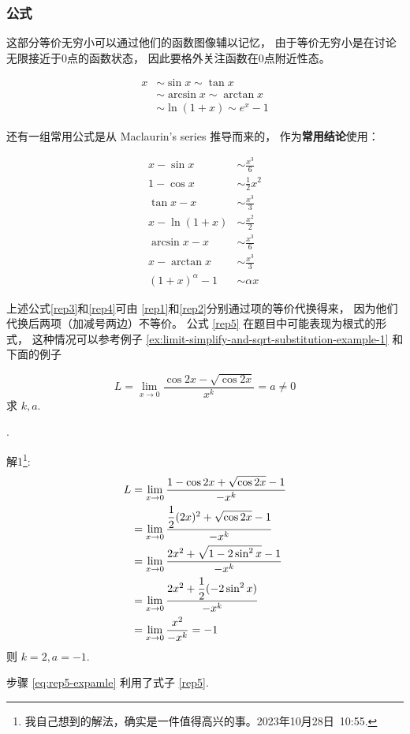 \subsubsection{公式}
这部分等价无穷小可以通过他们的函数图像辅以记忆，
由于等价无穷小是在讨论无限接近于0点的函数状态，
因此要格外关注函数在0点附近性态。

\begin{lemma}[等价无穷小]
	\begin{align}
		x&\sim\sin{x}\sim\tan{x} \\ 
		&\sim\arcsin{x}\sim\arctan{x} \\
		&\sim\ln{(1+x)}\sim e^x-1
	\end{align}
\end{lemma}

还有一组常用公式是从 Maclaurin's series 推导而来的，
作为\textbf{常用结论}使用：
\begin{lemma}[等价无穷小]
	\begin{align}
		x - \sin{x}     &\sim \frac{x^3}{6} \label{rep1} \\
        1 - \cos{x}     &\sim \frac{1}{2} x^2 \\
		\tan{x} - x     &\sim \frac{x^3}{3} \label{rep2} \\
		x - \ln{(1+x)}  &\sim \frac{x^2}{2} \\
		\arcsin{x} - x  &\sim \frac{x^3}{6} \label{rep3}\\
		x - \arctan{x}  &\sim \frac{x^3}{3} \label{rep4}\\
        (1+x)^\alpha-1  &\sim \alpha x \label{rep5}
	\end{align}
\end{lemma}
上述公式\eqref{rep3}和\eqref{rep4}可由
\eqref{rep1}和\eqref{rep2}分别通过项的等价代换得来，
因为他们代换后两项（加减号两边）不等价。
公式 \ref{rep5} 在题目中可能表现为根式的形式，
这种情况可以参考例子
\ref{ex:limit-simplify-and-sqrt-substitution-example-1}
和下面的例子

\begin{example}
    \label{ex:sqrt-substitution-example-2}
    \[
        L = \lim_{x \to 0} \dfrac{\cos 2x - \sqrt{\cos 2x}}{x^k} = a \neq 0
    \]
    求 $k, a$.

    \cite[question 131]{w660}.

    解1\footnote{我自己想到的解法，确实是一件值得高兴的事。2023年10月28日\, 10:55.}:
    \begin{align}
        L &= \lim_{x \to 0} \dfrac{ 1- \cos 2x + \sqrt{\cos 2x} -1 }{-x^k} \notag \\
          &= \lim_{x \to 0} \dfrac{ \dfrac{1}{2} (2x)^2 + \sqrt{\cos 2x} - 1 }{-x^k} \notag \\ 
          &= \lim_{x \to 0} \dfrac{ 2x^2 + \sqrt{1 - 2\sin^2 x } - 1 }{-x^k} \label{eq:rep5-expamle} \\
          &= \lim_{x \to 0} \dfrac{ 2x^2 + \dfrac{1}{2} (-2 \sin^2 x) }{-x^k} \notag \\
          &= \lim_{x \to 0} \dfrac{ x^2 }{-x^k} = -1 \notag
    \end{align}
    则 $k = 2, a = -1$.

    步骤 \ref{eq:rep5-expamle} 利用了式子 \ref{rep5}.
\end{example}

